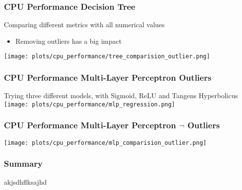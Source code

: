 \documentclass[aspectratio=169]{beamer}
\begin{document}
\begin{frame}{}
\frametitle{CPU Performance Decision Tree}
\center Comparing different metrics with all numerical values\\
\begin{minipage}{0.3\textwidth}
	\begin{itemize}
	\item Removing outliers has a big impact
	\end{itemize}
\end{minipage}
\begin{minipage}{0.69\textwidth}
  \center \texttt{[image: plots/cpu\_performance/tree\_comparision\_outlier.png]}
\end{minipage}
\end{frame}

\begin{frame}{}
\frametitle{CPU Performance Multi-Layer Perceptron Outliers}
\center Trying three different models, with Sigmoid, ReLU and Tangens Hyperbolicus
    \center \texttt{[image: plots/cpu\_performance/mlp\_regression.png]}
\end{frame}

\begin{frame}{}
\frametitle{CPU Performance Multi-Layer Perceptron $\neg$ Outliers}
    \center \texttt{[image: plots/cpu\_performance/mlp\_comparision\_outlier.png]}
\end{frame}

\begin{frame}{}
\frametitle{Summary}
akjsdhflksajhd
\end{frame}
\end{document}
